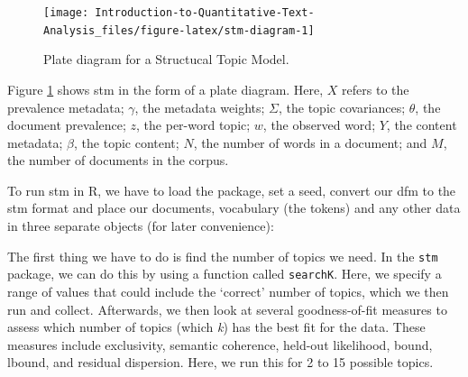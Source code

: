 \documentclass[
]{book}
\newenvironment{Shaded}{\begin{snugshade}}{\end{snugshade}}
\newcommand{\AttributeTok}[1]{\textcolor[rgb]{0.13,0.29,0.53}{#1}}
\newcommand{\DecValTok}[1]{\textcolor[rgb]{0.00,0.00,0.81}{#1}}
\newcommand{\FunctionTok}[1]{\textcolor[rgb]{0.13,0.29,0.53}{\textbf{#1}}}
\newcommand{\NormalTok}[1]{#1}
\newcommand{\OtherTok}[1]{\textcolor[rgb]{0.56,0.35,0.01}{#1}}
\newcommand{\SpecialCharTok}[1]{\textcolor[rgb]{0.81,0.36,0.00}{\textbf{#1}}}
\newcommand{\StringTok}[1]{\textcolor[rgb]{0.31,0.60,0.02}{#1}}
\begin{document}
\hfill\break

\begin{figure}
\texttt{[image: Introduction-to-Quantitative-Text-Analysis\_files/figure-latex/stm-diagram-1]} \caption{Plate diagram for a Structucal Topic Model.}\label{fig:stm-diagram}
\end{figure}

\hfill\break

Figure \ref{fig:stm-diagram} shows stm in the form of a plate diagram. Here, \(X\) refers to the prevalence metadata; \(\gamma\), the metadata weights; \(\Sigma\), the topic covariances; \(\theta\), the document prevalence; \(z\), the per-word topic; \(w\), the observed word; \(Y\), the content metadata; \(\beta\), the topic content; \(N\), the number of words in a document; and \(M\), the number of documents in the corpus.

To run stm in R, we have to load the package, set a seed, convert our dfm to the stm format and place our documents, vocabulary (the tokens) and any other data in three separate objects (for later convenience):

\begin{Shaded}
\end{Shaded}

The first thing we have to do is find the number of topics we need. In the \texttt{stm} package, we can do this by using a function called \texttt{searchK}. Here, we specify a range of values that could include the `correct' number of topics, which we then run and collect. Afterwards, we then look at several goodness-of-fit measures to assess which number of topics (which \emph{k}) has the best fit for the data. These measures include exclusivity, semantic coherence, held-out likelihood, bound, lbound, and residual dispersion. Here, we run this for 2 to 15 possible topics.
\end{document}
